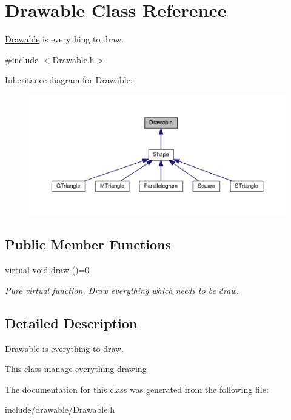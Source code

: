 \hypertarget{classDrawable}{}\section{Drawable Class Reference}
\label{classDrawable}


\hyperlink{classDrawable}{Drawable} is everything to draw.  




{\ttfamily \#include $<$Drawable.\+h$>$}



Inheritance diagram for Drawable\+:\nopagebreak
\begin{figure}[H]
\begin{center}
\leavevmode
\includegraphics[width=350pt]{classDrawable__inherit__graph}
\end{center}
\end{figure}
\subsection*{Public Member Functions}
\begin{DoxyCompactItemize}
\item 
\mbox{\label{classDrawable_aa37d7b328240d343134adcfe5e4dcd38}} 
virtual void \hyperlink{classDrawable_aa37d7b328240d343134adcfe5e4dcd38}{draw} ()=0
\begin{DoxyCompactList}\small\item\em Pure virtual function. Draw everything which needs to be draw. \end{DoxyCompactList}\end{DoxyCompactItemize}


\subsection{Detailed Description}
\hyperlink{classDrawable}{Drawable} is everything to draw. 

This class manage everything drawing 

The documentation for this class was generated from the following file\+:\begin{DoxyCompactItemize}
\item 
include/drawable/Drawable.\+h\end{DoxyCompactItemize}
